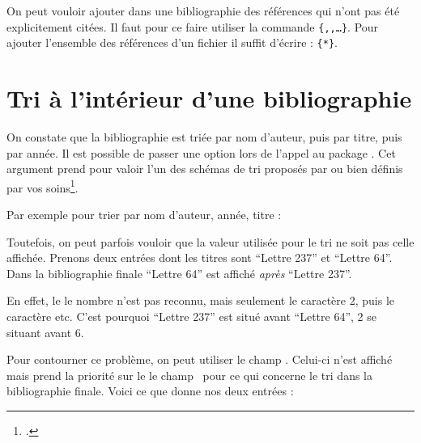 On peut vouloir ajouter dans une bibliographie des références qui n'ont pas été explicitement citées. Il faut pour ce faire utiliser la commande \verb|{|\verb|,|\verb|,…}|.
Pour ajouter l'ensemble des références d'un fichier  il suffit d'écrire : \verb|{*}|.

\section{Tri à l'intérieur d'une bibliographie}

On constate que la bibliographie est triée par nom d'auteur, puis par titre, puis par année. Il est possible de passer une option  lors de l'appel au package . Cet argument prend pour valoir l'un des schémas de tri proposés par  ou bien définis par vos soins\footcites[Pour les schémas de tri standards voir][]{biblatex_tri}[pour les schémas personnalisés, qui nécessitent l'utilisation de Biber (\cf{} p.~\pageref{biber}), voir][]{biblatex_triperso}.

Par exemple pour trier par nom d'auteur, année, titre :

\begin{latexcode}
\usepackage[sorting=nyt]{biblatex}
\end{latexcode}

Toutefois, on peut parfois vouloir que  la valeur utilisée pour le tri ne soit pas celle affichée. Prenons deux entrées dont les titres sont \enquote{Lettre 237} et \enquote{Lettre 64}. Dans la bibliographie finale
\enquote{Lettre 64} est affiché \emph{après} \enquote{Lettre 237}. 

En effet, le  le nombre  n'est pas reconnu, mais seulement le caractère {2}, puis le caractère  etc. C'est pourquoi \enquote{Lettre 237} est situé avant \enquote{Lettre 64}, 2 se situant avant 6.

Pour contourner ce problème, on peut utiliser le champ . Celui-ci n'est affiché mais prend la priorité sur le le champ  pour ce qui concerne le tri dans la bibliographie finale.  Voici ce que donne nos deux entrées :

\begin{latexcode}
@book{AugustinEpi64,
    Author = {Augustin},
    Sorttitle = {Lettre 064},
    Title = {Lettre 64}}
    
@book{AugustinEpi237,
    Author = {Augustin},
    Sorttitle = {Lettre 237},
    Title = {Lettre 237},
\end{latexcode}


